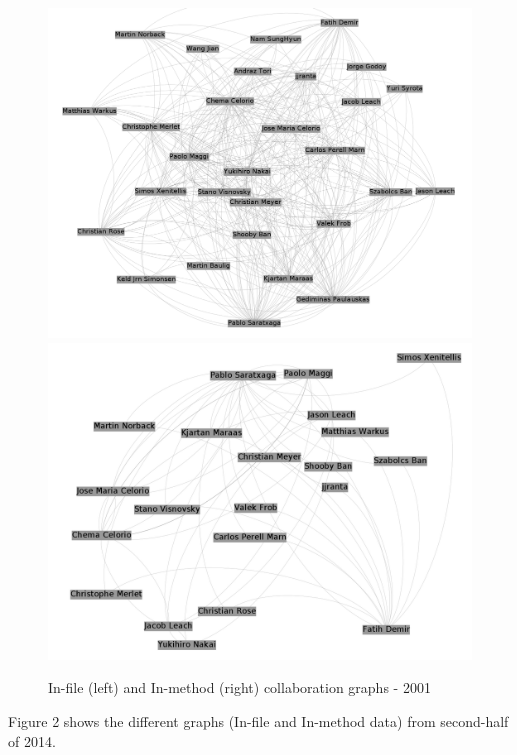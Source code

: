 \documentclass[a4paper]{article}
\begin{document}
\begin{figure}[ht]
\begin{center}
\includegraphics[scale=0.17]{g2001files.png} 
\includegraphics[scale=0.17]{g2001methods.png}
\caption{In-file (left) and In-method (right) collaboration graphs - 2001}
\label{fig:fixme1}
\end{center}
\end{figure}

Figure 2 shows the different graphs (In-file and In-method data) from
second-half of 2014.
\end{document}
